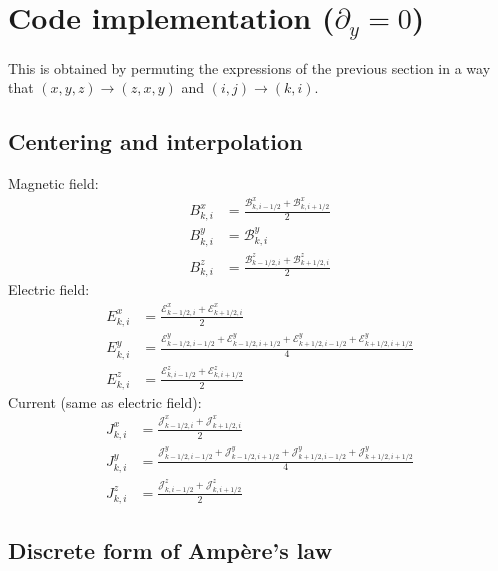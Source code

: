 \documentclass{article}
\begin{document}
\section{Code implementation ($\partial_y=0$)}

This is obtained by permuting the expressions of the previous section in a way
that $(x,y,z)\to(z,x,y)$ and $(i,j)\to(k,i)$.

\subsection{Centering and interpolation}

Magnetic field:
\begin{align}
  B^x_{k,i} &= \frac{\mathcal{B}^x_{k,i-1/2} + \mathcal{B}^x_{k,i+1/2}}{2} \\
  B^y_{k,i} &= \mathcal{B}^y_{k,i} \\
  B^z_{k,i} &= \frac{\mathcal{B}^z_{k-1/2,i} + \mathcal{B}^z_{k+1/2,i}}{2}
\end{align}
Electric field:
\begin{align}
  E^x_{k,i} &= \frac{\mathcal{E}^x_{k-1/2,i} + \mathcal{E}^x_{k+1/2,i}}{2} \\
  E^y_{k,i} &= \frac{\mathcal{E}^y_{k-1/2,i-1/2}
                   + \mathcal{E}^y_{k-1/2,i+1/2}
                   + \mathcal{E}^y_{k+1/2,i-1/2}
                   + \mathcal{E}^y_{k+1/2,i+1/2}}{4} \\
  E^z_{k,i} &= \frac{\mathcal{E}^z_{k,i-1/2} + \mathcal{E}^z_{k,i+1/2}}{2}
\end{align}
Current (same as electric field):
\begin{align}
  J^x_{k,i} &= \frac{\mathcal{J}^x_{k-1/2,i} + \mathcal{J}^x_{k+1/2,i}}{2} \\
  J^y_{k,i} &= \frac{\mathcal{J}^y_{k-1/2,i-1/2}
                   + \mathcal{J}^y_{k-1/2,i+1/2}
                   + \mathcal{J}^y_{k+1/2,i-1/2}
                   + \mathcal{J}^y_{k+1/2,i+1/2}}{4} \\
  J^z_{k,i} &= \frac{\mathcal{J}^z_{k,i-1/2} + \mathcal{J}^z_{k,i+1/2}}{2}
\end{align}

\subsection{Discrete form of Amp\`ere's law}
\end{document}
